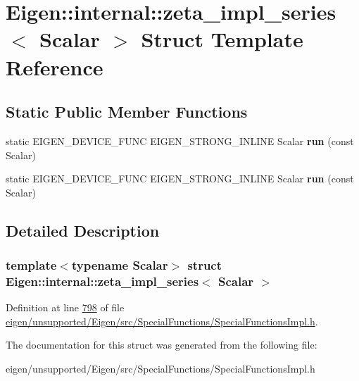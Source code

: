 \hypertarget{struct_eigen_1_1internal_1_1zeta__impl__series}{}\section{Eigen\+:\+:internal\+:\+:zeta\+\_\+impl\+\_\+series$<$ Scalar $>$ Struct Template Reference}
\label{struct_eigen_1_1internal_1_1zeta__impl__series}
\subsection*{Static Public Member Functions}
\begin{DoxyCompactItemize}
\item 
\mbox{\label{struct_eigen_1_1internal_1_1zeta__impl__series_a6bd4e758ebbf65bdf817965485b8dd72}} 
static E\+I\+G\+E\+N\+\_\+\+D\+E\+V\+I\+C\+E\+\_\+\+F\+U\+NC E\+I\+G\+E\+N\+\_\+\+S\+T\+R\+O\+N\+G\+\_\+\+I\+N\+L\+I\+NE Scalar {\bfseries run} (const Scalar)
\item 
\mbox{\label{struct_eigen_1_1internal_1_1zeta__impl__series_a6bd4e758ebbf65bdf817965485b8dd72}} 
static E\+I\+G\+E\+N\+\_\+\+D\+E\+V\+I\+C\+E\+\_\+\+F\+U\+NC E\+I\+G\+E\+N\+\_\+\+S\+T\+R\+O\+N\+G\+\_\+\+I\+N\+L\+I\+NE Scalar {\bfseries run} (const Scalar)
\end{DoxyCompactItemize}


\subsection{Detailed Description}
\subsubsection*{template$<$typename Scalar$>$\newline
struct Eigen\+::internal\+::zeta\+\_\+impl\+\_\+series$<$ Scalar $>$}



Definition at line \hyperlink{eigen_2unsupported_2_eigen_2src_2_special_functions_2_special_functions_impl_8h_source_l00798}{798} of file \hyperlink{eigen_2unsupported_2_eigen_2src_2_special_functions_2_special_functions_impl_8h_source}{eigen/unsupported/\+Eigen/src/\+Special\+Functions/\+Special\+Functions\+Impl.\+h}.



The documentation for this struct was generated from the following file\+:\begin{DoxyCompactItemize}
\item 
eigen/unsupported/\+Eigen/src/\+Special\+Functions/\+Special\+Functions\+Impl.\+h\end{DoxyCompactItemize}
